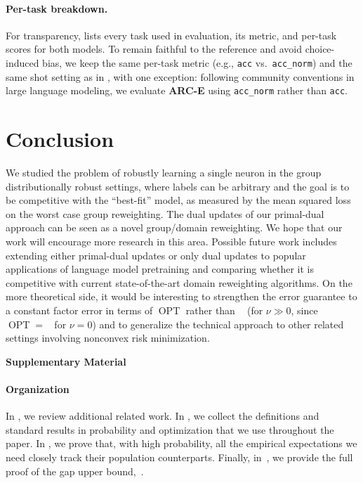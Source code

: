 \documentclass[11pt]{article}
\newcounter{thm}
\numberwithin{thm}{section}
\theoremstyle{plain}
\theoremstyle{definition}
\theoremstyle{remark} \newtheorem{remark}[thm]{Remark}
\DeclareMathOperator{\OPT}{OPT}
\DeclareMathOperator{\mOPT}{OPT_m}
\begin{document}
\paragraph{Per-task breakdown.}
For transparency,  lists every task used in evaluation, its metric, and per-task scores for both models. To remain faithful to the reference and avoid choice-induced bias, we keep the same per-task metric (e.g., \texttt{acc} vs.\ \texttt{acc\_norm}) and the same shot setting as in \citep{xia2024shearedllamaacceleratinglanguage}, with one exception: following community conventions in large language modeling, we evaluate \mbox{\textbf{ARC-E}} using \texttt{acc\_norm} rather than \texttt{acc}.

\section{Conclusion}\label{sec:conclusion}
We studied the problem of robustly learning a single neuron in the group distributionally robust settings, where labels can be arbitrary and the goal is to be competitive with the ``best-fit'' model, as measured by the mean squared loss on the worst case group reweighting.  
The dual updates of our primal-dual approach can be seen as a novel group/domain reweighting. We hope that our work will encourage more research in this area. Possible future work includes extending either primal-dual updates or only dual updates to popular applications of language model pretraining and comparing whether it is competitive with current state-of-the-art domain reweighting algorithms. On the more theoretical side, it would  be interesting to strengthen the error guarantee to a constant factor error in terms of $\OPT$ rather than $\mOPT$ (for $\nu \gg 0$, since $\OPT = \mOPT$ for $\nu = 0$) and to generalize the technical approach to other related settings involving nonconvex risk minimization.

\newpage
  



\clearpage
\appendix


\appendix
{}


\onecolumn
\begin{center}{\LARGE\bfseries Supplementary Material}
\end{center}

\paragraph{Organization} 
In , we review additional related work.  
In , we collect the definitions and standard results in probability and optimization that we use throughout the paper. 
In , we prove that, with high probability, all the empirical expectations we need closely track their population counterparts.  
Finally, in~, we provide the full proof of the gap upper bound,~.  
\end{document}

